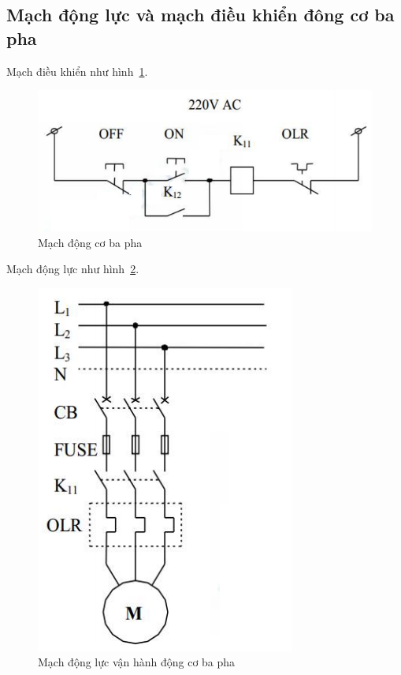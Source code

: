 \documentclass[13pt,a4paper]{extarticle}
\begin{document}
\subsection{Mạch động lực và mạch điều khiển đông cơ ba pha}
\begin{list}{--}{}
\item Mạch điều khiển như hình~\ref{Fig:mach-dieu-khien-3p}.
\begin{figure}[!h]
\begin{center}
\includegraphics[scale=.6]{van-hanh-3p-1}
\end{center}
\caption{Mạch động cơ ba pha}\label{Fig:mach-dieu-khien-3p}
\end{figure}
\item Mạch động lực như hình~\ref{Fig:mach-dong-luc-3p}.
\begin{figure}[!h]
\begin{center}
\includegraphics[scale=.6]{van-hanh-3p}
\end{center}
\caption{Mạch động lực vận hành động cơ ba pha}\label{Fig:mach-dong-luc-3p}
\end{figure}
\end{list}
\end{document}
